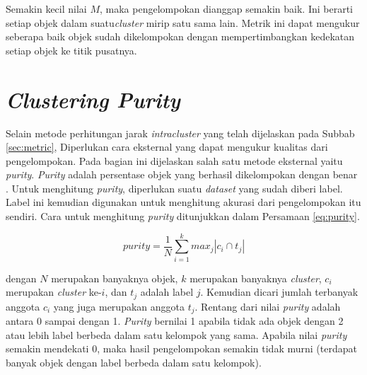 Semakin kecil nilai $M$, maka pengelompokan dianggap semakin baik. Ini berarti setiap objek dalam suatu\textit{cluster} mirip satu sama lain. Metrik ini dapat mengukur seberapa baik objek sudah dikelompokan dengan mempertimbangkan kedekatan setiap objek ke titik pusatnya.

\section{\textit{Clustering Purity}}
\label{sec:purity}
Selain metode perhitungan jarak \textit{intracluster} yang telah dijelaskan pada Subbab \ref{sec:metric}, Diperlukan cara eksternal yang dapat mengukur kualitas dari pengelompokan. Pada bagian ini dijelaskan salah satu metode eksternal yaitu \textit{purity}. \textit{Purity} adalah persentase objek yang berhasil dikelompokan dengan benar \cite{schutze2008introduction}. Untuk menghitung \textit{purity}, diperlukan suatu \textit{dataset} yang sudah diberi label. Label ini kemudian digunakan untuk menghitung akurasi dari pengelompokan itu sendiri. Cara untuk menghitung \textit{purity} ditunjukkan dalam Persamaan \ref{eq:purity}.

\begin{equation}
	\label{eq:purity}
	purity=\frac{1}{N}\sum^k_{i=1} max_j |c_i \cap t_j|
\end{equation}

dengan $N$ merupakan banyaknya objek, $k$ merupakan banyaknya \textit{cluster}, $c_i$ merupakan \textit{cluster} ke-$i$, dan $t_j$ adalah label $j$. Kemudian dicari jumlah terbanyak anggota $c_i$ yang juga merupakan anggota $t_j$. Rentang dari nilai \textit{purity} adalah antara 0 sampai dengan 1. \textit{Purity} bernilai 1 apabila tidak ada objek dengan 2 atau lebih label berbeda dalam satu kelompok yang sama. Apabila nilai \textit{purity} semakin mendekati 0, maka hasil pengelompokan semakin tidak murni (terdapat banyak objek dengan label berbeda dalam satu kelompok).
